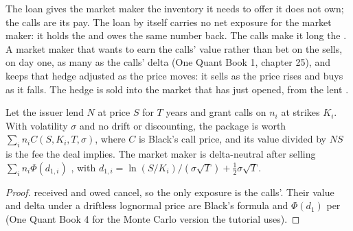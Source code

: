 The loan gives the market maker the inventory it needs to offer  it does not own; the calls are its pay. The
loan by itself carries no net exposure for the market maker: it holds the  and owes the same number back. The calls
make it long the . A market maker that wants to earn the calls' value rather than bet on the  sells, on day one,
as many  as the calls' delta (One Quant Book 1, chapter 25), and keeps that hedge adjusted as the price moves: it
sells as the price rises and buys as it falls. The hedge is sold into the market that has just opened, from the lent
.

\begin{proposition}\label{prop:m3:the-crypto-trading-business:deal}
Let the issuer lend $N$  at price $S$ for $T$ years and grant calls on $n_i$  at strikes $K_i$. With volatility
$\sigma$ and no drift or discounting, the package is worth $\sum_i n_i C(S, K_i, T, \sigma)$, where $C$ is Black's call price,
and its value divided by $NS$ is the fee the deal implies. The market maker is delta-neutral after selling
$\sum_i n_i \Phi(d_{1,i})$ , with $d_{1,i} = \ln(S/K_i)/(\sigma\sqrt T) + \tfrac12\sigma\sqrt T$.
\end{proposition}

\begin{proof}
 received and  owed cancel, so the only exposure is the calls'. Their value and delta under a driftless
lognormal price are Black's formula and $\Phi(d_1)$ per  (One Quant Book 4 for the Monte Carlo version the tutorial uses).
\end{proof}

